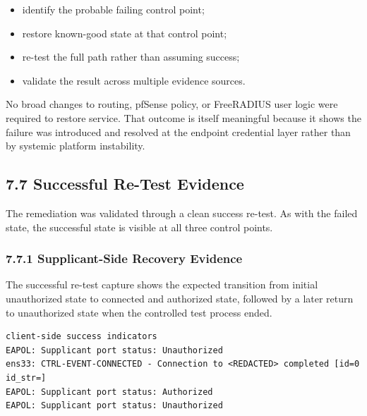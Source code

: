 \documentclass[11pt]{article}
\begin{document}
\begin{itemize}
    \item identify the probable failing control point;
    \item restore known-good state at that control point;
    \item re-test the full path rather than assuming success;
    \item validate the result across multiple evidence sources.
\end{itemize}

No broad changes to routing, pfSense policy, or FreeRADIUS user logic were required to restore service. That outcome is itself meaningful because it shows the failure was introduced and resolved at the endpoint credential layer rather than by systemic platform instability.


\subsection{7.7 Successful Re-Test Evidence}
\label{sec:successful-re-test-evidence}

The remediation was validated through a clean success re-test. As with the failed state, the successful state is visible at all three control points.

\subsubsection{7.7.1 Supplicant-Side Recovery Evidence}
\label{sec:supplicant-side-recovery-evidence}

The successful re-test capture shows the expected transition from initial unauthorized state to connected and authorized state, followed by a later return to unauthorized state when the controlled test process ended.

\begin{verbatim}
client-side success indicators
EAPOL: Supplicant port status: Unauthorized
ens33: CTRL-EVENT-CONNECTED - Connection to <REDACTED> completed [id=0 id_str=]
EAPOL: Supplicant port status: Authorized
EAPOL: Supplicant port status: Unauthorized
\end{verbatim}
\end{document}

